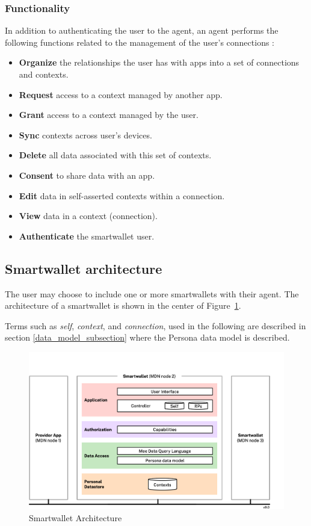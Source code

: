 \documentclass[11pt, oneside]{article}   	%
\begin{document}
\subsubsection{Functionality}

In addition to authenticating the user to the agent, an agent performs the following functions related to the management of the user's connections :

\begin{itemize}
\item \textbf{Organize} the relationships the user has with apps into a set of connections and contexts.
\item \textbf{Request} access to a context managed by another app.
\item \textbf{Grant} access to a context managed by the user.
\item \textbf{Sync} contexts across user's devices.
\item \textbf{Delete} all data associated with this set of contexts.
\item \textbf{Consent} to share data with an app.
\item \textbf{Edit} data in self-asserted contexts within a connection.
\item \textbf{View} data in a context (connection).
\item \textbf{Authenticate} the smartwallet user.
\end{itemize}

\subsection{Smartwallet architecture}

The user may choose to include one or more smartwallets with their agent. The architecture of a smartwallet is shown in the center of Figure~\ref{fig:architecture}. 

Terms such as \emph{self}, \emph{context}, and \emph{connection}, used in the following are described in section \ref{data_model_subsection} where the Persona data model is described.

\begin{figure}[htbp]
\includegraphics[width=\textwidth]{./images/architecture.png}
\caption{Smartwallet Architecture}
\label{fig:architecture}
\end{figure}
\end{document}
